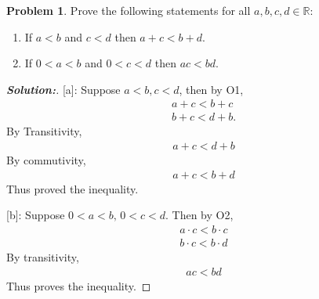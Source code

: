 \documentclass[12pt]{article}
\theoremstyle{definition}\newtheorem{problem}{Problem}
\newenvironment{solution}{\begin{proof}[\bfseries\textup{Solution:}]}{\end{proof}}
\begin{document}
\newpage
\begin{problem}
Prove the following statements for all $a,b,c,d\in\mathbb{R}$:
\begin{enumerate}
\item If $a<b$ and $c<d$ then $a+c < b+d$.
\item If $0<a<b$ and $0<c<d$ then $ac<bd$.
\end{enumerate}
\end{problem}
\begin{solution}

[a]:
Suppose $ a < b, c < d $, then by O1, \begin{align} 
    a + c < b + c \\
    b + c < d + b .
\end{align}
 By Transitivity, \begin{align} 
     a + c < d + b 
 \end{align}
 By commutivity, \begin{align} 
     a + c < b + d
    \end{align}
Thus proved the inequality.

[b]: Suppose $ 0 < a < b, \, 0<c<d $. Then by O2, \begin{align} 
    a \cdot c < b \cdot c \\
    b \cdot c < b \cdot d 
\end{align}
 By transitivity, \begin{align} 
     a  c < b  d
    \end{align}
    Thus proves the inequality.
\end{solution}
\end{document}
